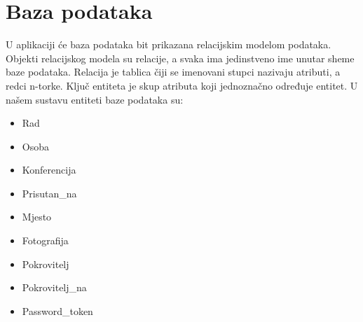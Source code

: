 		

		

				
		\section{Baza podataka}
		U aplikaciji će baza podataka bit prikazana relacijskim modelom podataka. Objekti relacijskog modela su relacije, a svaka ima jedinstveno ime unutar sheme baze podataka. Relacija je tablica čiji se imenovani stupci nazivaju atributi, a redci n-torke. Ključ entiteta je skup atributa koji jednoznačno određuje entitet. U našem sustavu entiteti baze podataka su:
	\begin{itemize}
		\item Rad
		\item Osoba
		\item Konferencija
		\item Prisutan\_na
		\item Mjesto
		\item Fotografija
		\item Pokrovitelj	
		\item Pokrovitelj\_na
		\item Password\_token	
	\end{itemize}
